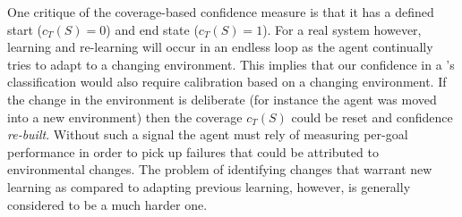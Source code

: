 One critique of the coverage-based confidence measure is that it has a defined start ($c_T(S)=0$) and end state ($c_T(S)=1$). For a real system however, learning and re-learning will occur in an endless loop as the agent continually tries to adapt to a changing environment. This implies that our confidence in a \dt's classification would also require calibration based on a changing environment. If the change in the environment is deliberate (for instance the agent was moved into a new environment) then the coverage $c_T(S)$ could be reset and confidence \textit{re-built}. Without such a signal the agent must rely of measuring per-goal performance in order to pick up failures that could be attributed to environmental changes. The problem of identifying changes that warrant new learning as compared to adapting previous learning, however, is generally considered to be a much harder one.

